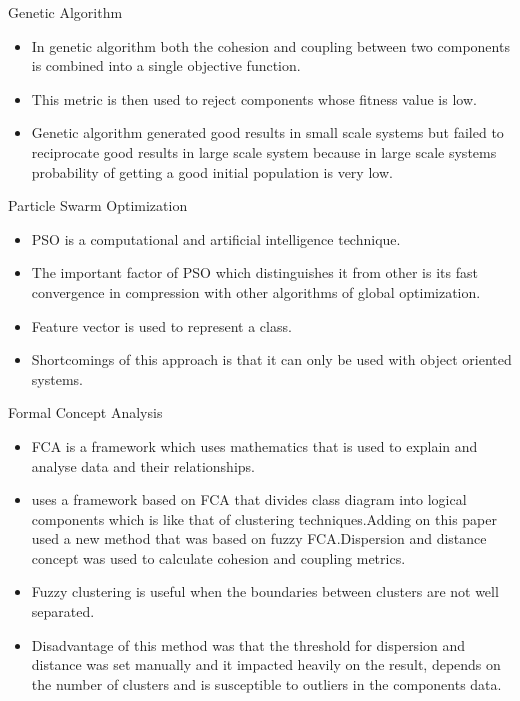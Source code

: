 \documentclass{beamer}
\begin{document}
\begin{frame}{Genetic Algorithm}
	\begin{itemize}
		\item In genetic algorithm both the cohesion and coupling between two components is combined into a single objective function.
		\item This metric is then used to reject components whose fitness value is low\cite{genetic}.
		\item Genetic algorithm generated good results in small scale systems but failed to reciprocate good results in large scale system because in large scale systems probability of getting a good initial population is very low\cite{evolution}.
	\end{itemize}
		
		\end{frame}
	\begin{frame}{Particle Swarm Optimization}
		\begin{itemize}
			\item PSO is a computational and artificial intelligence technique\cite{pso1}.
			\item The important factor of PSO which distinguishes it from other is its fast convergence in compression with other algorithms of global optimization.
			\item Feature vector is used to represent a class.
			\item Shortcomings of this approach is that it can only be used with object oriented systems.
		\end{itemize}
		

\end{frame}
\begin{frame}{Formal Concept Analysis}
	\begin{itemize}
		\item FCA is a framework which uses mathematics that is used to
		explain and analyse data and their relationships\cite{FCA1}.
		\item \cite{FCA} uses a framework based on FCA that divides class diagram into logical components which is like that of clustering techniques.Adding on this paper \cite{FCA} used a new method that was based on fuzzy FCA.Dispersion and distance concept was used to calculate cohesion and coupling metrics.
		\item Fuzzy clustering  is useful when the boundaries between clusters are not well separated.
		\item Disadvantage of this method was that the threshold for dispersion and distance was set manually and it impacted heavily on the result, depends on the number of clusters and is susceptible to outliers in the components data.
	\end{itemize}
\end{frame}
\end{document}
